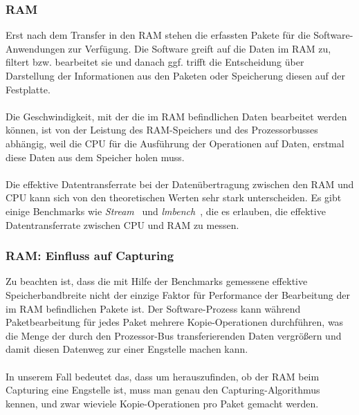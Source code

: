 {\subsubsection{RAM}\label{sec:ram}
Erst nach dem Transfer in den RAM stehen die erfassten Pakete für
die Software-Anwendungen zur Verfügung. Die Software greift auf die Daten im RAM
zu, filtert bzw. bearbeitet sie und danach ggf. trifft die Entscheidung über
Darstellung der Informationen aus den Paketen oder Speicherung  diesen auf der
Festplatte.\\\\
%
Die Geschwindigkeit, mit der die im RAM befindlichen Daten bearbeitet werden
können, ist von der Leistung des RAM-Speichers und des Prozessorbusses abhängig, weil
die CPU für die Ausführung der Operationen auf Daten, erstmal diese Daten aus
dem Speicher holen muss.\\\\
%
Die effektive Datentransferrate bei der Datenübertragung zwischen den RAM und CPU
kann sich von den theoretischen Werten sehr stark unterscheiden. 
Es gibt einige Benchmarks wie \emph{Stream}~\cite{web_stream} und
\emph{lmbench}~\cite{web_lmbench}, die es erlauben, die effektive 
Datentransferrate zwischen CPU und RAM zu messen.

\subsubsection*{RAM: Einfluss auf Capturing}\label{sec:ram_einfl_auf_cap}
Zu beachten ist, dass die mit Hilfe der Benchmarks gemessene effektive
Speicherbandbreite nicht der einzige Faktor für Performance der Bearbeitung der
im RAM befindlichen Pakete ist. Der Software-Prozess kann während
Paketbearbeitung für jedes Paket mehrere Kopie-Operationen durchführen, was die
Menge der durch den Prozessor-Bus transferierenden Daten vergrößern und damit
diesen Datenweg zur einer Engstelle machen kann.\\\\
%
In unserem Fall bedeutet das, dass um herauszufinden, ob der RAM beim Capturing
eine Engstelle ist, muss man genau den Capturing-Algorithmus kennen, und zwar 
wieviele Kopie-Operationen pro Paket gemacht werden. 
}
